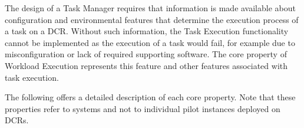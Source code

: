 \documentclass{sig-alternate}
\begin{document}
The design of a Task Manager requires that information is made available about
configuration and environmental features that determine the execution process of
a task on a DCR. Without such information, the Task Execution functionality
cannot be implemented as the execution of a task would fail, for example due
to misconfiguration or lack of required supporting software.  The core property
of Workload Execution represents this feature and other features associated with
task execution.

The following offers a detailed description of each core property. Note that
these properties refer to \pilot systems and not to individual pilot instances
deployed on DCRs.




\end{document}
